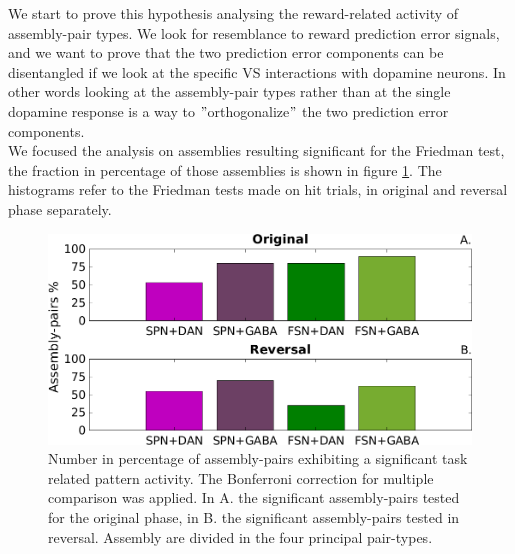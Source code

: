We start to prove this hypothesis analysing the reward-related activity of assembly-pair types. We look for resemblance to reward prediction error signals, and we want to prove that the two prediction error components can be disentangled if we look at the specific VS interactions with dopamine neurons. In other words looking at the assembly-pair types rather than at the single dopamine response is a way to $"$orthogonalize$"$ the two prediction error components.\\
We focused the analysis on assemblies resulting significant for the Friedman test, the fraction in percentage of those assemblies is shown in figure \ref{fig:PercAsFried}. The histograms refer to the Friedman tests made on hit trials, in original and reversal phase separately.\\
\begin{figure}
    \centering
    \includegraphics[scale=0.5]{figures/PercFriedHitTrialsBFf.png}
    \caption{Number in percentage of assembly-pairs exhibiting a significant task related pattern activity. The Bonferroni correction for multiple comparison was applied. In A. the significant assembly-pairs tested for the original phase, in B. the significant assembly-pairs tested in reversal. Assembly are divided in the four principal pair-types.}
    \label{fig:PercAsFried}
\end{figure}
